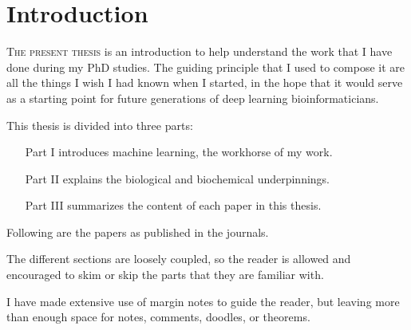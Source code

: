 \chapter{Introduction}

\lettrine[lines=3, lhang=0.25,  nindent=0em, findent=2pt]{\color{Maroon}T}{he present thesis}
is an introduction to help understand the work that I have done during my PhD studies.
The guiding principle that I used to compose it are all the things I wish I had known when I started, in the hope that it would serve as a starting point for future generations of deep learning bioinformaticians.

This thesis is divided into three parts:

\begin{itemize}
	\item[Part I] introduces machine learning, the workhorse of my work.
	\item[Part II] explains the biological and biochemical underpinnings.
	\item[Part III] summarizes the content of each paper in this thesis.
\end{itemize}

Following are the papers as published in the journals.

The different sections are loosely coupled, so the reader is allowed and encouraged to skim or skip the parts that they are familiar with.

I have made extensive use of margin notes to guide the reader, but leaving more than enough space for notes, comments, doodles, or theorems.

